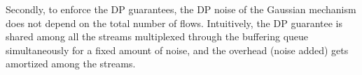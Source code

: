 Secondly, to enforce the DP guarantees, the DP noise of the Gaussian
mechanism does not depend on the total number of flows. Intuitively, the DP
guarantee is shared among all the streams multiplexed through the buffering
queue simultaneously for a fixed amount of noise, and the overhead (\ie noise
added) gets amortized among the streams.

%
%



